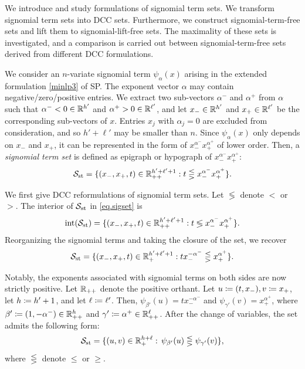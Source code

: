 We introduce and study formulations of signomial term sets. We transform signomial term sets into DCC sets. Furthermore, we construct  signomial-term-free sets and lift them to signomial-lift-free sets. The maximality of these sets is investigated, and a comparison is carried out between signomial-term-free sets derived from different DCC formulations.


We consider an $n$-variate signomial term $\psi_{\alpha}(x)$ arising in the extended formulation \eqref{minlp3} of SP.
The exponent vector $\alpha$ may contain negative/zero/positive entries. We extract  two sub-vectors $\alpha^-$ and $\alpha^+$ from $\alpha$ such that $\alpha^- < 0 \in \mathbb R^{h'}$ and $\alpha^+ > 0 \in \mathbb R^{\ell'}$, and let $x_- \in \mathbb R^{h'}$ and  $x_+ \in \mathbb R^{\ell'}$ be the corresponding sub-vectors of $x$. Entries $x_j$ with $\alpha_j = 0$ are excluded from consideration, and so $h' + \ell'$ may be smaller than $n$. Since $\psi_{\alpha}(x)$ only depends on $x_-$ and $x_+$, it can be represented in the form of $x_{-}^{\alpha^-} x_{+}^{\alpha^+}$ of lower order. Then, a \emph{signomial term set} is defined as  epigraph or hypograph of $x_{-}^{\alpha^-}  x_{+}^{\alpha^+}$:
\begin{equation}
	\label{eq.sigset}
  \mathcal S_{\mathrm{st}} = \{(x_-,x_+, t) \in \mathbb R_{++}^{h' + \ell'+1}: t  \lesseqgtr x_{-}^{\alpha^-}  x_{+}^{\alpha^+} \}.
\end{equation}


We first give DCC reformulations of  signomial term sets.
Let $\lessgtr$ denote  $<$ or $>$. The interior of $\mathcal S_{\mathrm{st}}$ in \eqref{eq.sigset} is
 \begin{equation*}
   \operatorname{int}(\mathcal S_{\mathrm{st}}) = \{(x_-,x_+, t) \in \mathbb R_{++}^{h' + \ell'+1} : t \lessgtr x_{-}^{\alpha^-}  x_{+}^{\alpha^+} \}.
\end{equation*}
Reorganizing the signomial terms and taking the closure of the set, we recover
\begin{equation*}
  	\mathcal S_{\mathrm{st}} =\{ (x_-,x_+, t) \in \mathbb R_{+}^{h' + \ell'+1}:  t x_-^{-\alpha^-} \lesseqgtr x_+^{\alpha^+}\}.
\end{equation*}


Notably, the exponents associated with signomial terms on both sides are now strictly positive. Let $\mathbb R_{++}$ denote the positive orthant. Let $u \coloneqq (t,x_-), v \coloneqq x_+$, let $h \coloneqq h'+1$, and let $\ell \coloneqq \ell'$. Then, $\psi_{\beta'}(u)=t x_-^{-\alpha^-}$ and $ \psi_{\gamma'}(v)=x_+^{\alpha^+}$, where \(\beta'\coloneqq(1, -\alpha^-) \in \mathbb R_{++}^h\) and \(\gamma' \coloneqq \alpha^+  \in \mathbb R_{++}^\ell\).  After the change of variables, the set  admits the following form:
\begin{equation}
\label{eq.form1}
	\mathcal S_{\mathrm{st}} =  \{(u, v) \in \mathbb R_{+}^{h + \ell}:\, \psi_{\beta'}(u) \lesseqgtr \psi_{\gamma'}(v)\},
\end{equation}
where $\lesseqgtr$ denote  $\le$ or $\ge$.

